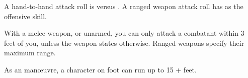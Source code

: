 
A hand-to-hand attack roll is  \orr {} versus  \orr {}. A ranged weapon attack roll has  as the offensive skill.

With a melee weapon, or unarmed, you can only attack a combatant within 3 feet of you, unless the weapon states otherwise. Ranged weapons specify their maximum range.

As an  man\oe{}uvre, a character on foot can run up to 15 +  feet.
